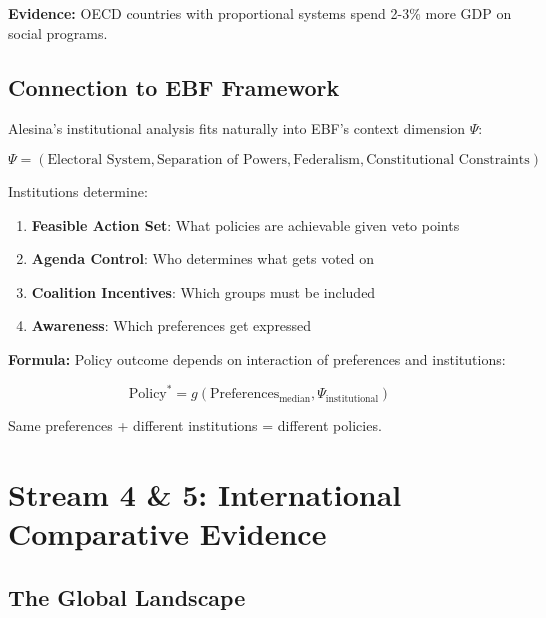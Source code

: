 \textbf{Evidence:} OECD countries with proportional systems spend 2-3\% more GDP on social programs.

\subsection{Connection to EBF Framework}

Alesina's institutional analysis fits naturally into EBF's context dimension $\Psi$:

\begin{equation}
\Psi = (\text{Electoral System}, \text{Separation of Powers}, \text{Federalism}, \text{Constitutional Constraints})
\end{equation}

Institutions determine:

\begin{enumerate}
\item \textbf{Feasible Action Set}: What policies are achievable given veto points
\item \textbf{Agenda Control}: Who determines what gets voted on
\item \textbf{Coalition Incentives}: Which groups must be included
\item \textbf{Awareness}: Which preferences get expressed
\end{enumerate}

\textbf{Formula:} Policy outcome depends on interaction of preferences and institutions:

\begin{equation}
\text{Policy}^* = g(\text{Preferences}_{\text{median}}, \Psi_{\text{institutional}})
\end{equation}

Same preferences + different institutions = different policies.

\clearpage


\section{Stream 4 \& 5: International Comparative Evidence}
\label{sec:alesina-comparative}

\subsection{The Global Landscape}

